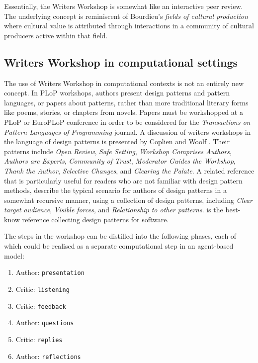 Essentially, the Writers Workshop is somewhat like an interactive peer review. The underlying concept is reminiscent of Bourdieu's {\em fields of cultural production} \cite{bourdieu93} where cultural value is attributed through interactions in a community of cultural producers active within that field. 

\subsection{Writers Workshop in computational settings}
The use of Writers Workshop in computational contexts is not an
entirely new concept. In PLoP workshops, authors present design
patterns and pattern languages, or papers about patterns, rather than
more traditional literary forms like poems, stories, or chapters from
novels.  Papers must be workshopped at a PLoP or EuroPLoP conference
in order to be considered for the \emph{Transactions on Pattern
  Languages of Programming} journal.  A discussion of writers
workshops in the language of design patterns is presented by Coplien
and Woolf \citeyear{coplien1997pattern}.  Their patterns include
\emph{Open Review}, \emph{Safe Setting}, \emph{Workshop Comprises
  Authors}, \emph{Authors are Experts}, \emph{Community of Trust},
\emph{Moderator Guides the Workshop}, \emph{Thank the Author},
\emph{Selective Changes}, and \emph{Clearing the Palate}.
%
A related reference that is particularly useful for readers who are
not familiar with design pattern methods, 
describe the typical scenario for authors of design patterns in a
somewhat recursive manner, using a collection of design patterns,
including \emph{Clear target audience}, \emph{Visible forces}, and
\emph{Relationship to other patterns}.   is the
best-know reference collecting design patterns for software.

The steps in the workshop can be distilled into the following phases,
each of which could be realised as a separate computational step in an
agent-based model:
\begin{center}
\begin{fminipage}{.60\columnwidth}
\begin{enumerate}[itemsep=0pt]
\item Author: {\tt presentation}
\item Critic: {\tt listening}
\item Critic: {\tt feedback}
\item Author: {\tt questions}
\item Critic: {\tt replies}
\item Author: {\tt reflections}
\end{enumerate}
\end{fminipage}
\end{center}

